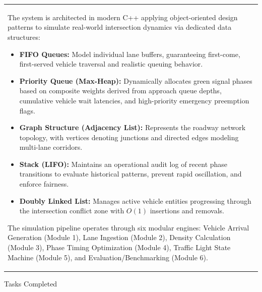 \documentclass[12pt,a4paper]{article}
\newcommand{\sectiontitle}[1]{%
    {\color{GEUBlue}
    \fontsize{16.5}{20}\selectfont #1}
}
\newcommand{\instruction}[1]{%
    {\color{InstructionGrey}
    \fontsize{9.5}{12}\selectfont #1}
}
\newcommand{\answerbox}[2]{%
    \noindent
    \begin{tabularx}{\textwidth}{
        |>{\raggedright\arraybackslash}X|}
        \hline
        \parbox[t][#1][t]{\dimexpr\linewidth-12pt\relax}{
            \vspace{4pt}
            \fontsize{10}{13.5}\selectfont #2
        }\\
        \hline
    \end{tabularx}
}
\begin{document}
\vspace{0.15cm}

\answerbox{8.20cm}{The system is architected in modern C++ applying object-oriented design patterns to simulate real-world intersection dynamics via dedicated data structures:
\begin{itemize}\setlength{\itemsep}{2.5pt}\setlength{\parskip}{0pt}\setlength{\leftskip}{-8pt}
    \item \textbf{FIFO Queues:} Model individual lane buffers, guaranteeing first-come, first-served vehicle traversal and realistic queuing behavior.
    \item \textbf{Priority Queue (Max-Heap):} Dynamically allocates green signal phases based on composite weights derived from approach queue depths, cumulative vehicle wait latencies, and high-priority emergency preemption flags.
    \item \textbf{Graph Structure (Adjacency List):} Represents the roadway network topology, with vertices denoting junctions and directed edges modeling multi-lane corridors.
    \item \textbf{Stack (LIFO):} Maintains an operational audit log of recent phase transitions to evaluate historical patterns, prevent rapid oscillation, and enforce fairness.
    \item \textbf{Doubly Linked List:} Manages active vehicle entities progressing through the intersection conflict zone with $O(1)$ insertions and removals.
\end{itemize}
\vspace{2pt}
The simulation pipeline operates through six modular engines: Vehicle Arrival Generation (Module 1), Lane Ingestion (Module 2), Density Calculation (Module 3), Phase Timing Optimization (Module 4), Traffic Light State Machine (Module 5), and Evaluation/Benchmarking (Module 6).}

\newpage


\vspace*{0.05cm}

\sectiontitle{Tasks Completed}

\vspace{0.03cm}

\instruction{

}

\vspace{0.15cm}
\end{document}
